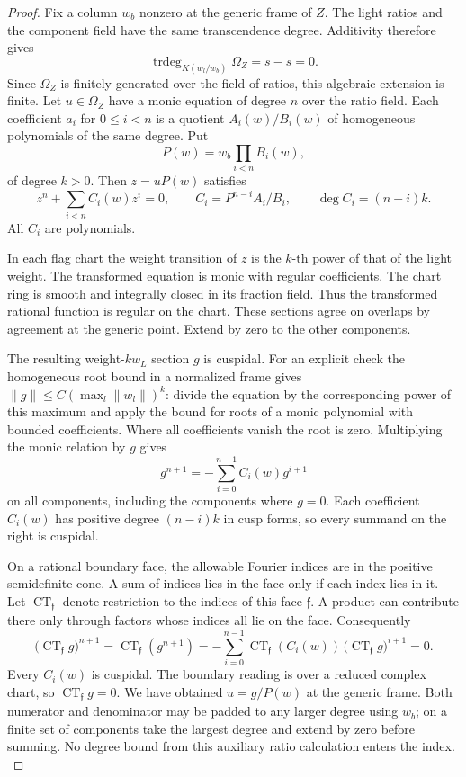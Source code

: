 \begin{proof}
Fix a column \(w_b\) nonzero at the generic frame of \(Z\).
The light ratios and the component field have the same transcendence degree. Additivity therefore gives
\[
  \operatorname{trdeg}_{K(w_l/w_b)}\Omega_Z=s-s=0.
\]
Since \(\Omega_Z\) is finitely generated over the field of ratios, this algebraic extension is finite. Let \(u\in\Omega_Z\)
have a monic equation of degree \(n\) over the ratio field. Each
coefficient \(a_i\) for \(0\le i<n\) is a quotient
\(A_i(w)/B_i(w)\) of homogeneous polynomials of the same degree.
Put 
\[
  P(w)=w_b\prod_{i<n} B_i(w),
\]
 of degree \(k>0\).
Then \(z=uP(w)\) satisfies
\[
 z^n+\sum_{i<n} C_i(w)z^i=0,\qquad
 C_i=P^{n-i}A_i/B_i,\qquad \deg C_i=(n-i)k .
\]
All \(C_i\) are polynomials.

In each flag chart the weight
transition of \(z\) is the \(k\)-th power of that of the light
weight. The transformed equation is monic with regular coefficients.
The chart ring is smooth and integrally closed in its fraction field.
Thus the transformed rational function is regular on the chart.
These sections agree on overlaps by agreement at the generic point.
Extend by zero to the other components.

The resulting weight-\(k w_L\) section \(g\) is cuspidal. For an
explicit check the homogeneous root bound in a normalized frame
gives \(\|g\|\le C(\max_l\|w_l\|)^k\): divide the equation by
the corresponding power of this maximum and apply the bound for
roots of a monic polynomial with bounded coefficients. Where all
coefficients vanish the root is zero. Multiplying the monic relation by \(g\) gives
\[
               g^{n+1}=-\sum_{i=0}^{n-1} C_i(w)g^{i+1}
\]
on all components, including the components where \(g=0\).
Each coefficient \(C_i(w)\) has positive degree \((n-i)k\)
in cusp forms, so every summand on the right is cuspidal.

On a rational boundary face, the allowable Fourier indices
are in the positive semidefinite cone. A sum of indices lies
in the face only if each index lies in it. Let \(\operatorname{CT}_{\mathfrak f}\) denote restriction to
the indices of this face \(\mathfrak f\). A product can contribute
there only through factors whose indices all lie on the face.
Consequently
\[
 \bigl(\operatorname{CT}_{\mathfrak f}g\bigr)^{n+1}
   =\operatorname{CT}_{\mathfrak f}(g^{n+1})
   =-\sum_{i=0}^{n-1}
     \operatorname{CT}_{\mathfrak f}(C_i(w))\,
           \bigl(\operatorname{CT}_{\mathfrak f}g\bigr)^{i+1}
   =0.
\]
Every \(C_i(w)\) is cuspidal. The boundary reading is over a reduced
complex chart, so \(\operatorname{CT}_{\mathfrak f}g=0\). We have obtained
\(u=g/P(w)\) at the generic frame. Both numerator and denominator
may be padded to any larger degree using \(w_b\); on a finite set
of components take the largest degree and extend by zero before
summing. No degree bound from this auxiliary ratio calculation
enters the index. \label{cor:selected-slice-2}


\end{proof}
